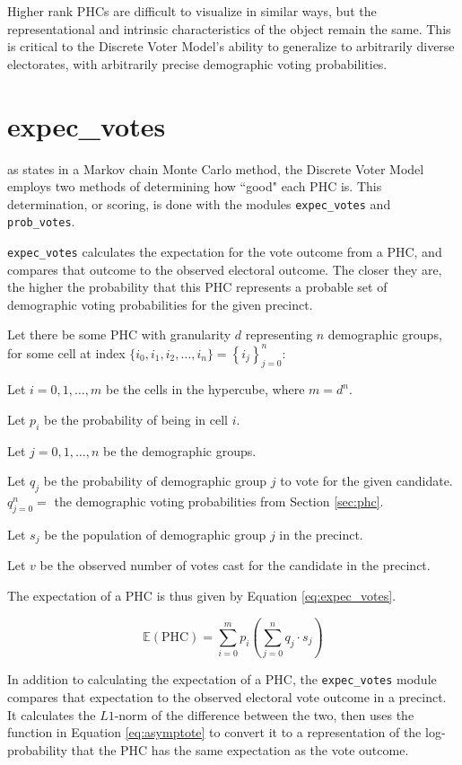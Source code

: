 Higher rank PHCs are difficult to visualize in similar ways, but the representational and intrinsic characteristics of the object remain the same. This is critical to the Discrete Voter Model's ability to generalize to arbitrarily diverse electorates, with arbitrarily precise demographic voting probabilities.


\section{expec\_votes}
\label{sec:ev}

 as states in a Markov chain Monte Carlo method, the Discrete Voter Model employs two methods of determining how ``good" each PHC is. This determination, or scoring, is done with the modules \texttt{expec\_votes} and \texttt{prob\_votes}.

\texttt{expec\_votes} calculates the expectation for the vote outcome from a PHC, and compares that outcome to the observed electoral outcome. The closer they are, the higher the probability that this PHC represents a probable set of demographic voting probabilities for the given precinct.

Let there be some PHC with granularity $d$ representing $n$ demographic groups, for some cell at index $\{i_0, i_1, i_2, \dots, i_n\} = \left\{i_j\right\}_{j=0}^n$:

Let $i = 0, 1, \dots, m$ be the cells in the hypercube, where $m = d^n$.

Let $p_i$ be the probability of being in cell $i$.

Let $j = 0, 1, \dots, n$ be the demographic groups.

Let $q_j$ be the probability of demographic group $j$ to vote for the given candidate. ${q}_{j=0}^n =$ the demographic voting probabilities from Section \ref{sec:phc}.

Let $s_j$ be the population of demographic group $j$ in the precinct.

Let $v$ be the observed number of votes cast for the candidate in the precinct.

The expectation of a PHC is thus given by Equation \ref{eq:expec_votes}.

\begin{equation}
 \mathbb{E}(\text{PHC}) = \sum_{i = 0}^m p_i \left(\sum_{j = 0}^n q_j \cdot s_j\right)
 \label{eq:expec_votes}
\end{equation}

In addition to calculating the expectation of a PHC, the \texttt{expec\_votes} module compares that expectation to the observed electoral vote outcome in a precinct. It calculates the $L1$-norm of the difference between the two, then uses the function in Equation \ref{eq:asymptote} to convert it to a representation of the log-probability that the PHC has the same expectation as the vote outcome.

